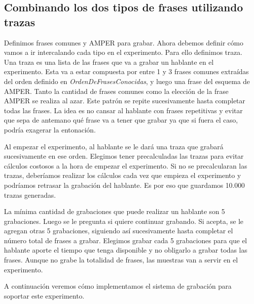 \subsection{Combinando los dos tipos de frases utilizando trazas}

Definimos frases comunes y AMPER para grabar. Ahora debemos definir cómo vamos a ir intercalando cada tipo en el experimento. Para ello definimos traza. Una traza es una lista de las frases que va a grabar un hablante en el experimento. Esta va a estar compuesta por entre 1 y 3 frases comunes extraídas del orden definido en \textit{OrdenDeFrasesConocidas}, y luego una frase del esquema de AMPER. Tanto la cantidad de frases comunes como la elección de la frase AMPER se realiza al azar. Este patrón se repite sucesivamente hasta completar todas las frases. La idea es no cansar al hablante con frases repetitivas y evitar que sepa de antemano qué frase va a tener que grabar ya que si fuera el caso, podría exagerar la entonación.

Al empezar el experimento, al hablante se le dará una traza que grabará sucesivamente en ese orden. Elegimos tener precalculadas las trazas para evitar cálculos costosos a la hora de empezar el experimento. Si no se precalcularan las trazas, deberíamos realizar los cálculos cada vez que empieza el experimento y podríamos retrasar la grabación del hablante. Es por eso que guardamos 10.000 trazas generadas. 

La mínima cantidad de grabaciones que puede realizar un hablante son 5 grabaciones. Luego se le pregunta si quiere continuar grabando. Si acepta, se le agregan otras 5 grabaciones, siguiendo así sucesivamente hasta completar el número total de frases a grabar. Elegimos grabar cada 5 grabaciones para que el hablante aporte el tiempo que tenga disponible y no obligarlo a grabar todas las frases. Aunque no grabe la totalidad de frases, las muestras van a servir en el experimento.

A continuación veremos cómo implementamos el sistema de grabación para soportar este experimento.
